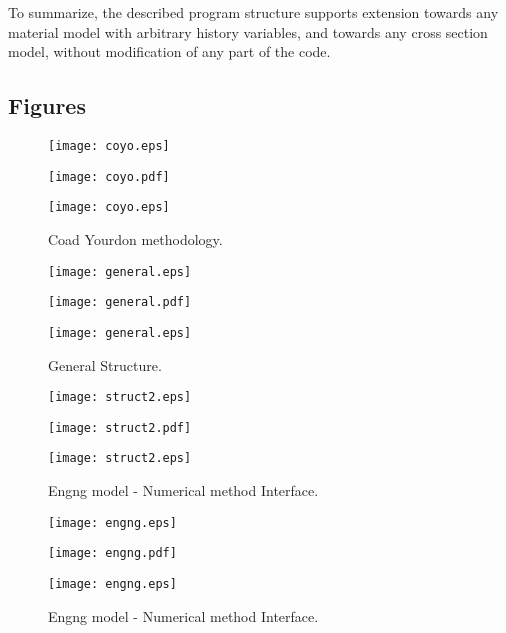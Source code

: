 \documentclass[a4paper]{article}
\begin{document}
To summarize, the described  program structure supports extension
towards any material model with arbitrary history variables, and
towards any cross section model, without modification of any part of
the code. 

\begin{htmlonly}
\section{Figures}
\end{htmlonly}

\begin{figure}[ht]
\begin{htmlonly}
  \centerline{\texttt{[image: coyo.eps]}}
\end{htmlonly}
\ifpdf
\centerline{\texttt{[image: coyo.pdf]}}
\else
\centerline{\texttt{[image: coyo.eps]}}
\fi
\caption{Coad Yourdon methodology.}
\label{coyo}
\end{figure}


\begin{figure}[tb]
\begin{htmlonly}
  \centerline{\texttt{[image: general.eps]}}
\end{htmlonly}
\ifpdf
\centerline{\texttt{[image: general.pdf]}}
\else
\centerline{\texttt{[image: general.eps]}}
\fi
\caption{General Structure.}
\label{genstructfig}
\end{figure}


\begin{figure}[tb]
\begin{htmlonly}
  \centerline{\texttt{[image: struct2.eps]}}
\end{htmlonly}
\ifpdf
\centerline{\texttt{[image: struct2.pdf]}}
\else
\centerline{\texttt{[image: struct2.eps]}}
\fi
\caption{Engng model - Numerical method Interface.}
\label{engngNummet1fig}
\end{figure}



\begin{figure}[tb]
\begin{htmlonly}
  \centerline{\texttt{[image: engng.eps]}}
\end{htmlonly}
\ifpdf
\centerline{\texttt{[image: engng.pdf]}}
\else
\centerline{\texttt{[image: engng.eps]}}
\fi
\caption{Engng model - Numerical method Interface.}
\label{engngNummet2fig}
\end{figure}
\end{document}
